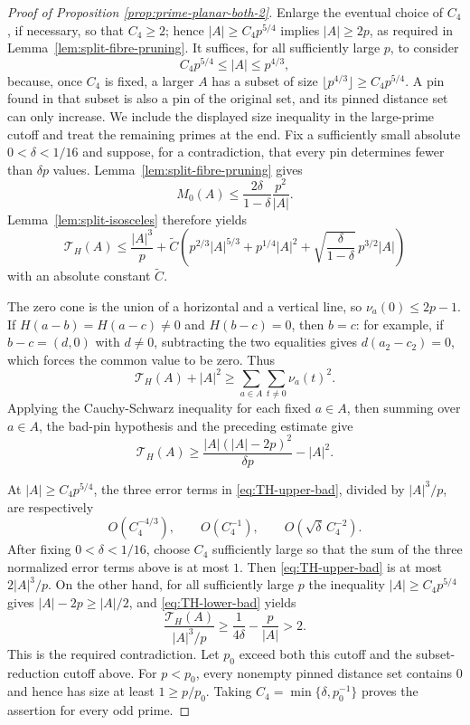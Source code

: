 \documentclass[11pt]{article}
\begin{document}
\begin{proof}[Proof of Proposition \ref{prop:prime-planar-both-2}]
Enlarge the eventual choice of $C_4$, if necessary, so that
$C_4\ge2$; hence $|A|\ge C_4p^{5/4}$ implies $|A|\ge2p$, as required
in Lemma~\ref{lem:split-fibre-pruning}.  It suffices, for all
sufficiently large $p$, to consider
\[
 C_4p^{5/4}\le |A|\le p^{4/3},
\]
because, once $C_4$ is fixed, a larger $A$ has a subset of size
$\lfloor p^{4/3}\rfloor\ge C_4p^{5/4}$.  A pin found in that subset
is also a pin of the original set, and its pinned distance set can
only increase.  We include the displayed size inequality in the
large-prime cutoff and treat the remaining primes at the end.
Fix a sufficiently small absolute
$0<\delta<1/16$ and suppose, for a contradiction, that every pin
determines fewer than $\delta p$ values.  Lemma~\ref{lem:split-fibre-pruning}
gives
\[
 M_0(A)\le
 \frac{2\delta}{1-\delta}\frac{p^2}{|A|}.
\]
Lemma~\ref{lem:split-isosceles} therefore yields
\begin{equation}
 \label{eq:TH-upper-bad}
 \mathcal T_H(A)
 \le\frac{|A|^3}{p}
 +\widetilde{C}\left(
 p^{2/3}|A|^{5/3}
 +p^{1/4}|A|^2
 +\sqrt{\frac{\delta}{1-\delta}}\,p^{3/2}|A|
 \right)
\end{equation}
with an absolute constant $\widetilde{C}$.

The zero cone is the union of a horizontal and a vertical line, so
$\nu_a(0)\le2p-1$.  If
$H(a-b)=H(a-c)\ne0$ and $H(b-c)=0$, then $b=c$:
for example, if $b-c=(d,0)$ with $d\ne0$, subtracting the two
equalities gives $d(a_2-c_2)=0$, which forces the common value to be
zero.  Thus
\[
 \mathcal T_H(A)+|A|^2
 \ge\sum_{a\in A}\sum_{t\ne0}\nu_a(t)^2.
\]
Applying the Cauchy-Schwarz inequality for each fixed \(a\in A\),
then summing over \(a\in A\), the bad-pin hypothesis and the preceding
estimate give
\begin{equation}
 \label{eq:TH-lower-bad}
 \mathcal T_H(A)
 \ge
 \frac{|A|(|A|-2p)^2}{\delta p}-|A|^2.
\end{equation}

At $|A|\ge C_4p^{5/4}$, the three error terms in \eqref{eq:TH-upper-bad}, divided by $|A|^3/p$, are respectively
\[
 O(C_4^{-4/3}),\qquad
 O(C_4^{-1}),\qquad
 O\!\left(\sqrt{\delta}\,C_4^{-2}\right).
\]
After fixing $0<\delta<1/16$, choose $C_4$ sufficiently large so
that the sum of the three normalized error
terms above is at most $1$.  Then
\eqref{eq:TH-upper-bad} is at most $2|A|^3/p$.  On the other hand, for
all sufficiently large $p$ the inequality
$|A|\ge C_4p^{5/4}$ gives $|A|-2p\ge |A|/2$, and
\eqref{eq:TH-lower-bad} yields
\[
 \frac{\mathcal T_H(A)}{|A|^3/p}
 \ge \frac1{4\delta}-\frac{p}{|A|}>2.
\]
This is the required contradiction. 
Let $p_0$ exceed both this cutoff and the subset-reduction
cutoff above.  For $p<p_0$, every nonempty pinned distance set contains
$0$ and hence has size at least $1\ge p/p_0$. Taking $C_4=\min\{\delta,p_0^{-1}\}$ proves the assertion for every odd prime.
\end{proof}
\end{document}
